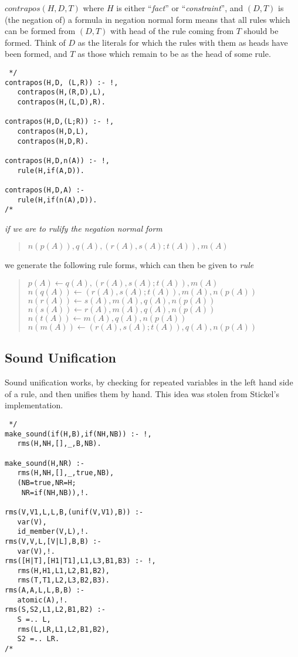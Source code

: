 $contrapos(H,D,T)$ where $H$ is either ``{\em fact\/}'' 
or ``{\em constraint\/}'', and $(D,T)$ is (the negation of)
a formula in negation normal form means that all rules
which can be formed from $(D,T)$ with head of the rule coming from $T$
should be formed.
Think of $D$ as the literals for which the rules with them as heads
have been formed, and $T$ as those which remain to be as the head of
some rule.
\begin{verbatim} */
contrapos(H,D, (L,R)) :- !,
   contrapos(H,(R,D),L),
   contrapos(H,(L,D),R).

contrapos(H,D,(L;R)) :- !,
   contrapos(H,D,L),
   contrapos(H,D,R).

contrapos(H,D,n(A)) :- !,
   rule(H,if(A,D)).

contrapos(H,D,A) :-
   rule(H,if(n(A),D)).
/* \end{verbatim}
\begin{example} \em
if we are to {\em rulify} the negation normal form
\begin{quote}
$n(p(A)),q(A),(r(A),s(A);t(A)),m(A)$
\end{quote}
we generate the following rule forms, which can then be given to {\em rule}
\begin{quote}
$p(A)\leftarrow q(A),(r(A),s(A);t(A)),m(A)$\\
$n(q(A))\leftarrow (r(A),s(A);t(A)),m(A),n(p(A))$\\
$n(r(A))\leftarrow s(A),m(A),q(A),n(p(A))$\\
$n(s(A))\leftarrow r(A),m(A),q(A),n(p(A))$\\
$n(t(A))\leftarrow m(A),q(A),n(p(A))$\\
$n(m(A))\leftarrow (r(A),s(A);t(A)),q(A),n(p(A))$
\end{quote}
\end{example}
\subsection{Sound Unification}
Sound unification works, by checking for repeated variables in the left
hand side of a rule, and then unifies them by hand. This idea was stolen from 
Stickel's implementation.

\begin{verbatim} */
make_sound(if(H,B),if(NH,NB)) :- !,
   rms(H,NH,[],_,B,NB).

make_sound(H,NR) :-
   rms(H,NH,[],_,true,NB),
   (NB=true,NR=H;
    NR=if(NH,NB)),!.

rms(V,V1,L,L,B,(unif(V,V1),B)) :-
   var(V),
   id_member(V,L),!.
rms(V,V,L,[V|L],B,B) :-
   var(V),!.
rms([H|T],[H1|T1],L1,L3,B1,B3) :- !,
   rms(H,H1,L1,L2,B1,B2),
   rms(T,T1,L2,L3,B2,B3).
rms(A,A,L,L,B,B) :-
   atomic(A),!.
rms(S,S2,L1,L2,B1,B2) :-
   S =.. L,
   rms(L,LR,L1,L2,B1,B2),
   S2 =.. LR.
/* \end{verbatim}

